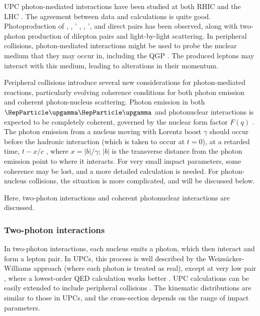 \documentclass[../report.tex]{subfiles}
\begin{document}
UPC photon-mediated interactions have been studied at both RHIC and the LHC \cite{Baltz:2007kq,Bertulani:2005ru,Klein:2017nqo,Bertulani:1987tz,Baur:2001jj}.  The agreement between data and calculations is quite good.  Photoproduction of \PGr, \PGo, \PGr' , \PJGy, \PJGy', \PGU and direct \PGpp\PGpm pairs has been observed, along with two-photon production of dilepton pairs and light-by-light scattering.  In peripheral collisions, photon-mediated interactions might be used to probe the nuclear medium that they may occur in, including the QGP \cite{Aaboud:2018eph,Adam:2018tdm}. The produced leptons may interact with this medium, leading to alterations in their momentum.    

Peripheral collisions introduce several new considerations for  photon-mediated reactions, particularly evolving coherence conditions for both photon emission and coherent photon-nucleus scattering.  Photon emission in both $\PGg\PGg$ and photonuclear interactions is expected to be completely coherent, governed by the nuclear form factor $F(q)$ \cite{Vidovic:1992ik}.   The photon emission from a nucleus moving with Lorentz boost $\gamma$ should occur before the hadronic interaction (which is taken to occur at $t=0$), at a retarded time, $t-x/c$ \cite{Zha:2017jch}, where $x=|b|/\gamma$; $|b|$ is the transverse distance from the photon emission point to where it interacts. For very small impact parameters, some coherence may be lost, and a more detailed calculation is needed.  For photon-nucleus collisions, the situation is more complicated, and will be discussed below. 

Here, two-photon interactions and coherent photonuclear interactions are discussed. 

\subsubsection{Two-photon interactions}

In two-photon interactions, each nucleus emits a photon, which then interact and form a lepton pair. In UPCs, this process is well described by the Weizs{\"a}cker-Williams approach (where each photon is treated as real), except at very low pair \pT, where a lowest-order QED calculation works better \cite{Adams:2004rz}. UPC calculations can be easily extended to include peripheral collisions \cite{Klein:2018cjh, Zha:2018ywo,Klusek-Gawenda:2018zfz}.  The kinematic distributions are similar to those in UPCs, and the cross-section depends on the range of impact parameters.
\end{document}
